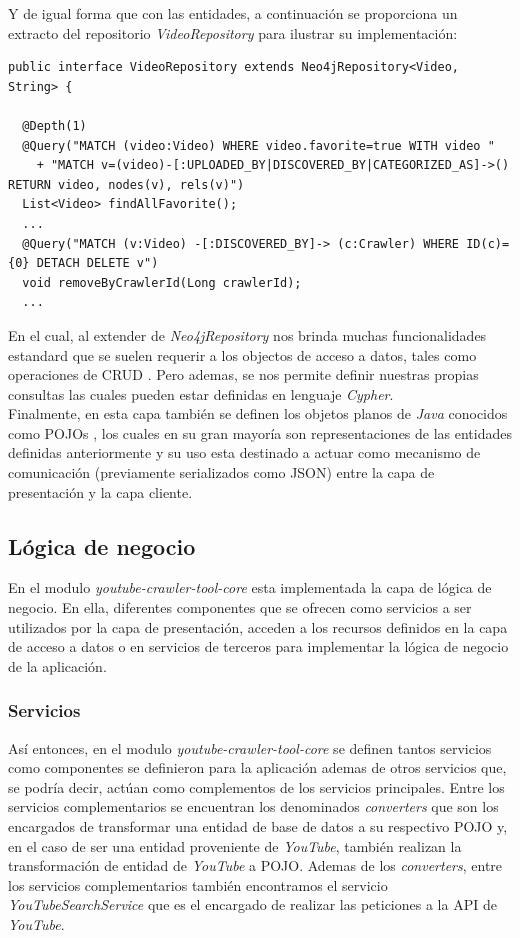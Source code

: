\documentclass[11pt,a4paper]{article}
\begin{document}
Y de igual forma que con las entidades, a continuación se proporciona un extracto del repositorio \textit{VideoRepository} para ilustrar su implementación: 
\begin{lstlisting}[style=C]
public interface VideoRepository extends Neo4jRepository<Video, String> {

  @Depth(1)
  @Query("MATCH (video:Video) WHERE video.favorite=true WITH video "
    + "MATCH v=(video)-[:UPLOADED_BY|DISCOVERED_BY|CATEGORIZED_AS]->() RETURN video, nodes(v), rels(v)")
  List<Video> findAllFavorite();
  ...		
  @Query("MATCH (v:Video) -[:DISCOVERED_BY]-> (c:Crawler) WHERE ID(c)={0} DETACH DELETE v")
  void removeByCrawlerId(Long crawlerId);
  ...
\end{lstlisting}
En el cual, al extender de \textit{Neo4jRepository} nos brinda muchas funcionalidades estandard que se suelen requerir a los objectos de acceso a datos, tales como operaciones de CRUD \cite{42}. Pero ademas, se nos permite definir nuestras propias consultas las cuales pueden estar definidas en lenguaje \textit{Cypher}.
\\

Finalmente, en esta capa también se definen los objetos planos de \textit{Java} conocidos como POJOs \cite{43}, los cuales en su gran mayoría son representaciones de las entidades definidas anteriormente y su uso esta destinado a actuar como mecanismo de comunicación (previamente serializados como JSON) entre la capa de presentación y la capa cliente.
\medskip 

\subsection{Lógica de negocio}
En el modulo \textit{youtube-crawler-tool-core} esta implementada la capa de lógica de negocio. En ella, diferentes componentes que se ofrecen como servicios a ser utilizados por la capa de presentación, acceden a los recursos definidos en la capa de acceso a datos o en servicios de terceros para implementar la lógica de negocio de la aplicación.
\medskip 

\subsubsection{Servicios}
Así entonces, en el modulo \textit{youtube-crawler-tool-core} se definen tantos servicios como componentes se definieron para la aplicación ademas de otros servicios que, se podría decir, actúan como complementos de los servicios principales. Entre los servicios complementarios se encuentran los denominados \textit{converters} que son los encargados de transformar una entidad de base de datos a su respectivo POJO y, en el caso de ser una entidad proveniente de \textit{YouTube}, también realizan la transformación de entidad de \textit{YouTube} a POJO. Ademas de los \textit{converters}, entre los servicios complementarios también encontramos el servicio \textit{YouTubeSearchService} que es el encargado de realizar las peticiones a la API de \textit{YouTube}.
\\
\end{document}
